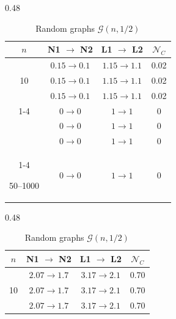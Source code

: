        \begin{table}[h!]
            \centering
            \setlength{\tabcolsep}{2pt}
        
            \begin{subtable}[t]{0.48\textwidth}
                \centering
                \begin{tabular}{c|c|c|c}
                    \toprule
                    $n$ & N1 $\rightarrow$ N2 & L1 $\rightarrow$ L2 & $\mathcal{N}_C$ \\
                    \midrule
        
                    \multirow{3}{*}{10}
                        & $0.15 \rightarrow 0.1$ & $1.15 \rightarrow 1.1$ & 0.02 \\
                        & $0.15 \rightarrow 0.1$ & $1.15 \rightarrow 1.1$ & 0.02 \\
                        & $0.15 \rightarrow 0.1$ & $1.15 \rightarrow 1.1$ & 0.02 \\
        
                    \cmidrule(lr){1-4}
        
                    \multirow{3}{*}{20}
                        & $0 \rightarrow 0$ & $1 \rightarrow 1$ & 0 \\
                        & $0 \rightarrow 0$ & $1 \rightarrow 1$ & 0 \\
                        & $0 \rightarrow 0$ & $1 \rightarrow 1$ & 0 \\
        
                    \cmidrule(lr){1-4}
        
                    50--1000 & $0 \rightarrow 0$ & $1 \rightarrow 1$ & 0 \\
                    \bottomrule
                \end{tabular}
                \caption*{Random graphs $\mathcal{G}(n, 1/2)$}
            \end{subtable}
            \hfill
            \begin{subtable}[t]{0.48\textwidth}
                \centering
                \begin{tabular}{c|c|c|c}
                    \toprule
                    $n$ & N1 $\rightarrow$ N2 & L1 $\rightarrow$ L2 & $\mathcal{N}_C$ \\
                    \midrule
        
                    \multirow{3}{*}{10}
                        & $2.07 \rightarrow 1.7$ & $3.17 \rightarrow 2.1$ & 0.70 \\
                        & $2.07 \rightarrow 1.7$ & $3.17 \rightarrow 2.1$ & 0.70 \\
                        & $2.07 \rightarrow 1.7$ & $3.17 \rightarrow 2.1$ & 0.70 \\
        

\end{tabular}
\end{subtable}
\end{table}
